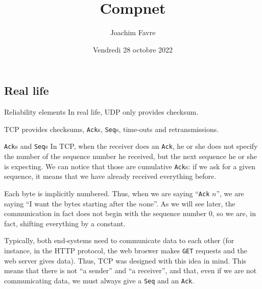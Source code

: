 \documentclass[a4paper]{article}
\title{Compnet}
\author{Joachim Favre}
\date{Vendredi 28 octobre 2022}
\begin{document}
\maketitle


\subsection{Real life}

\begin{parag}{Reliability elements}
    In real life, UDP only provides checksum.

    TCP provides checksums, \texttt{Ack}s, \texttt{Seq}s, time-outs and retransmissions.
\end{parag}

\begin{parag}{\texttt{Ack}s and \texttt{Seq}s}
    In TCP, when the receiver does an \texttt{Ack}, he or she does not specify the number of the sequence number he received, but the next sequence he or she is expecting. We can notice that those are cumulative \texttt{Ack}s: if we ask for a given sequence, it means that we have already received everything before.

    Each byte is implicitly numbered. Thus, when we are saying ``\texttt{Ack} $n$'', we are saying ``I want the bytes starting after the $n$\Th one''. As we will see later, the communication in fact does not begin with the sequence number 0, so we are, in fact, shifting everything by a constant.

    Typically, both end-systems need to communicate data to each other (for instance, in the HTTP protocol, the web broswer makes \texttt{GET} requests and the web server gives data). Thus, TCP was designed with this idea in mind. This means that there is not ``a sender'' and ``a receiver'', and that, even if we are not communicating data, we must always give a \texttt{Seq} and an \texttt{Ack}.
\end{parag}
\end{document}
